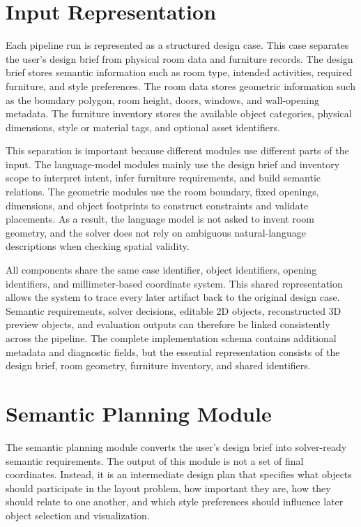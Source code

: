 \section{Input Representation}\label{sec:problem1-input-representation}

Each pipeline run is represented as a structured design case. This case separates the user's design brief from physical room data and furniture records. The design brief stores semantic information such as room type, intended activities, required furniture, and style preferences. The room data stores geometric information such as the boundary polygon, room height, doors, windows, and wall-opening metadata. The furniture inventory stores the available object categories, physical dimensions, style or material tags, and optional asset identifiers.

This separation is important because different modules use different parts of the input. The language-model modules mainly use the design brief and inventory scope to interpret intent, infer furniture requirements, and build semantic relations. The geometric modules use the room boundary, fixed openings, dimensions, and object footprints to construct constraints and validate placements. As a result, the language model is not asked to invent room geometry, and the solver does not rely on ambiguous natural-language descriptions when checking spatial validity.

All components share the same case identifier, object identifiers, opening identifiers, and millimeter-based coordinate system. This shared representation allows the system to trace every later artifact back to the original design case. Semantic requirements, solver decisions, editable 2D objects, reconstructed 3D preview objects, and evaluation outputs can therefore be linked consistently across the pipeline. The complete implementation schema contains additional metadata and diagnostic fields, but the essential representation consists of the design brief, room geometry, furniture inventory, and shared identifiers.

\section{Semantic Planning Module}\label{sec:problem1-semantic-planning-module}

The semantic planning module converts the user's design brief into solver-ready semantic requirements. The output of this module is not a set of final coordinates. Instead, it is an intermediate design plan that specifies what objects should participate in the layout problem, how important they are, how they should relate to one another, and which style preferences should influence later object selection and visualization.

